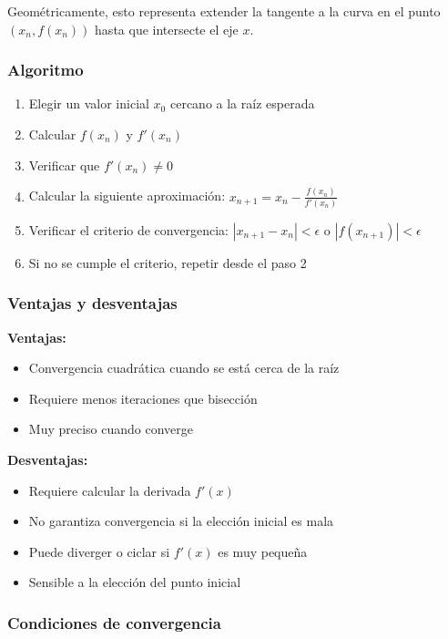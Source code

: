 \documentclass[12pt,a4paper]{article}
\begin{document}
Geométricamente, esto representa extender la tangente a la curva en el punto $(x_n, f(x_n))$ hasta que intersecte el eje $x$.

\subsubsection{Algoritmo}

\begin{enumerate}
    \item Elegir un valor inicial $x_0$ cercano a la raíz esperada
    \item Calcular $f(x_n)$ y $f'(x_n)$
    \item Verificar que $f'(x_n) \neq 0$
    \item Calcular la siguiente aproximación: $x_{n+1} = x_n - \frac{f(x_n)}{f'(x_n)}$
    \item Verificar el criterio de convergencia: $|x_{n+1} - x_n| < \epsilon$ o $|f(x_{n+1})| < \epsilon$
    \item Si no se cumple el criterio, repetir desde el paso 2
\end{enumerate}

\subsubsection{Ventajas y desventajas}

\textbf{Ventajas:}
\begin{itemize}
    \item Convergencia cuadrática cuando se está cerca de la raíz
    \item Requiere menos iteraciones que bisección
    \item Muy preciso cuando converge
\end{itemize}

\textbf{Desventajas:}
\begin{itemize}
    \item Requiere calcular la derivada $f'(x)$
    \item No garantiza convergencia si la elección inicial es mala
    \item Puede diverger o ciclar si $f'(x)$ es muy pequeña
    \item Sensible a la elección del punto inicial
\end{itemize}

\subsubsection{Condiciones de convergencia}
\end{document}
